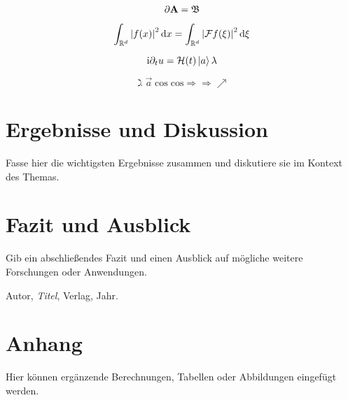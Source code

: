 \documentclass[12pt]{report}
\begin{document}
\begin{equation*}
    \partial \mathbf{A} = \mathfrak{B}
\end{equation*}

\medskip

\begin{equation}
    \int_{\mathbb{R}^d} {\left\vert f(x)\right\vert}^2 \, \mathrm{d} x = \int_{\mathbb{R}^d} {\left\vert\mathcal{F} f(\xi)\right\vert}^2 \, \mathrm{d} \xi
\end{equation}

\medskip

\begin{equation}
    \mathrm{i} \partial_t u = \mathcal{H}(t) \Ket{a} \lambda 
\end{equation}

\begin{equation}
    \gimel \overrightarrow{a} \cos \mathrm{cos} \Rightarrow \Longrightarrow \nearrow 
\end{equation}

\section{Ergebnisse und Diskussion}
Fasse hier die wichtigsten Ergebnisse zusammen und diskutiere sie im Kontext des Themas.

\section{Fazit und Ausblick}
Gib ein abschließendes Fazit und einen Ausblick auf mögliche weitere Forschungen oder Anwendungen.

\begin{thebibliography}{99}
     Autor, \emph{Titel}, Verlag, Jahr.
\end{thebibliography}

\appendix
\section{Anhang}
Hier können ergänzende Berechnungen, Tabellen oder Abbildungen eingefügt werden.
\end{document}
